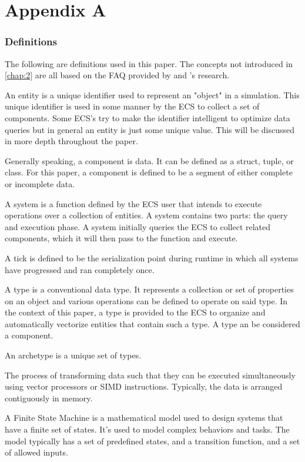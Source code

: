 \section{Appendix A}
\subsubsection{Definitions}  
\label{appendix:a}

The following are definitions used in this paper. The concepts not introduced in \ref{chap:2} are all based on the FAQ provided by \cite{SanderMertensFAQ} and \cite{RomeoPHD}'s research.
\begin{description}[font=\sffamily\bfseries, leftmargin=1cm, style=nextline]
    \item[Entity]
        An entity is a unique identifier used to represent an "object" in a simulation. This unique identifier is used in some manner by the ECS to collect a set of components. Some ECS's try to make the identifier intelligent to optimize data queries but in general an entity is just some unique value. This will be discussed in more depth throughout the paper.
    \item[Component]
        Generally speaking, a component is data. It can be defined as a struct, tuple, or class. For this paper, a component is defined to be a segment of either complete or incomplete data.
    \item[System]
        A system is a function defined by the ECS user that intends to execute operations over a collection of entities. A system contains two parts: the query and execution phase. A system initially queries the ECS to collect related components, which it will then pass to the function and execute.
    \item[Tick]
        A tick is defined to be the serialization point during runtime in which all systems have progressed and ran completely once.
    \item[Type]
        A type is a conventional data type. It represents a collection or set of properties on an object and various operations can be defined to operate on said type. In the context of this paper, a type is provided to the ECS to organize and automatically vectorize entities that contain such a type. A type an be considered a component.
    \item[Archetype] 
        An archetype is a unique set of types.
    \item[Vectorization]
        The process of transforming data such that they can be executed simultaneously using vector processors or SIMD instructions. Typically, the data is arranged contiguously in memory.
    \item[Finite State Machine]
        A Finite State Machine is a mathematical model used to design systems that have a finite set of states. It's used to model complex behaviors and tasks. The model typically has a set of predefined states, and a transition function, and a set of allowed inputs. 
  \end{description}
